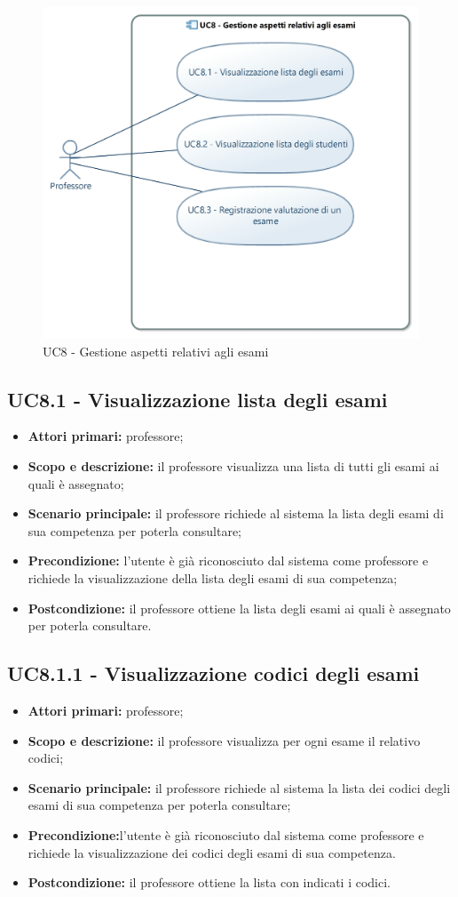 \documentclass[AnalisiDeiRequisiti.tex]{subfiles}
\begin{document}
\begin{figure}[H]
	\centering
	\includegraphics[width=0.8\linewidth]{UC8.jpg}
	\caption{UC8 - Gestione aspetti relativi agli esami}
	\label{fig:UC8 - Gestione aspetti relativi agli esami}
\end{figure}

\subsection{UC8.1 - Visualizzazione lista degli esami}
\begin{itemize}
	\item \textbf{Attori primari:} professore;
	\item \textbf{Scopo e descrizione:} il professore visualizza una lista di tutti gli esami ai quali è assegnato;
	\item \textbf{Scenario principale:} il professore richiede al sistema la lista degli esami di sua competenza per poterla consultare;
	\item \textbf{Precondizione:} l'utente è già riconosciuto dal sistema come professore e richiede la visualizzazione della lista degli esami di sua competenza;
	\item \textbf{Postcondizione:} il professore ottiene la lista degli esami ai quali è assegnato per poterla consultare.
\end{itemize}
\subsection{UC8.1.1 - Visualizzazione codici degli esami}
\begin{itemize}
	\item \textbf{Attori primari:} professore;
	\item \textbf{Scopo e descrizione:} il professore visualizza per ogni esame il relativo codici;
	\item \textbf{Scenario principale:} il professore richiede al sistema la lista dei codici degli esami di sua competenza per poterla consultare;
	\item \textbf{Precondizione:}l'utente è già riconosciuto dal sistema come professore e richiede la visualizzazione dei codici degli esami di sua competenza.
	\item \textbf{Postcondizione:} il professore ottiene la lista con indicati i codici.
\end{itemize}
\end{document}
